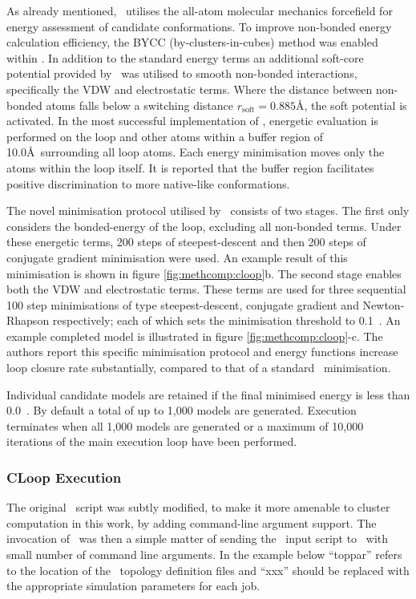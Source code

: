 As already mentioned, \cloop\ utilises the  all-atom molecular mechanics forcefield\cite{COMPCHEM:MacKerell1998} for energy assessment of candidate conformations. To improve non-bonded energy calculation efficiency, the BYCC (by-clusters-in-cubes) method\cite{COMPCHEM:Petrella2003} was enabled within \charmm. In addition to the standard energy terms an additional soft-core potential provided by \charmm\ was utilised to smooth non-bonded interactions, specifically the VDW and electrostatic terms. Where the distance between non-bonded atoms falls below a switching distance $r_\mathrm{soft}=0.885$\AA, the soft potential is activated. In the most successful implementation of \cloop, energetic evaluation is performed on the loop and other atoms within a buffer region of 10.0\AA\ surrounding all loop atoms. Each energy minimisation moves only the atoms within the loop itself. It is reported that the buffer region facilitates positive discrimination to more native-like conformations.

The novel minimisation protocol utilised by \cloop\ consists of two stages. The first only considers the bonded-energy of the loop, excluding all non-bonded terms. Under these energetic terms, 200 steps of steepest-descent and then 200 steps of conjugate gradient minimisation were used. An example result of this minimisation is shown 
in figure \ref{fig:methcomp:cloop}b. The second stage enables both the VDW and electrostatic terms. These terms are used for three sequential 100 step minimisations of type steepest-descent, conjugate gradient and Newton-Rhapson respectively; each of which sets the  minimisation threshold to \mbox{0.1 \kcalmol}. An example completed model is illustrated in figure \ref{fig:methcomp:cloop}-c.
The authors report this specific minimisation protocol and energy functions increase loop closure rate substantially, compared to that of a standard \charmm\ minimisation.

Individual candidate models are retained if the final minimised energy is less than \mbox{0.0 \kcalmol}. By default a total of up to 1,000 models are generated. Execution terminates when all 1,000 models are generated or a maximum of 10,000 iterations of the main execution loop have been performed. 
\subsubsection{CLoop Execution}

The original \cloop\ script was subtly modified, to make it more amenable to cluster computation in this work, by adding command-line argument support. The invocation of \cloop\ was then a simple matter of
sending the \charmm\ input script to \charmm\ with small number of command line arguments.
In the example below ``toppar'' refers to the location of the \charmm\ topology definition files and ``xxx'' should be replaced with the appropriate simulation parameters for each job.

